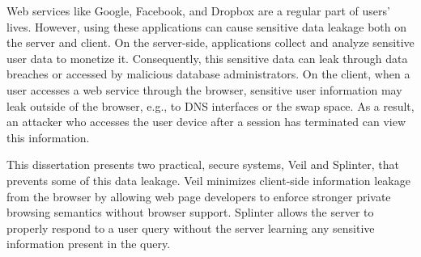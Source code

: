 Web services like Google, Facebook, and Dropbox 
are a regular part of users' lives. However,
using these applications can cause sensitive data
leakage both on the server and client.
On the server-side, applications collect and analyze
sensitive user data to monetize it. Consequently,
this sensitive data can leak through data breaches
or accessed by malicious database administrators. 
On the client, when a user accesses a web service
through the browser, sensitive user information
may leak outside of the browser, 
e.g., to DNS interfaces or the swap space.
As a result, an attacker who accesses the user
device after a session has terminated can view
this information.

This dissertation presents two practical,
secure systems, Veil and Splinter, that
prevents some of this data leakage. Veil minimizes
client-side information leakage from the browser by allowing
web page developers to enforce stronger private browsing 
semantics without browser support. Splinter 
allows the server to properly respond to a user
query without the server learning any sensitive
information present in the query.